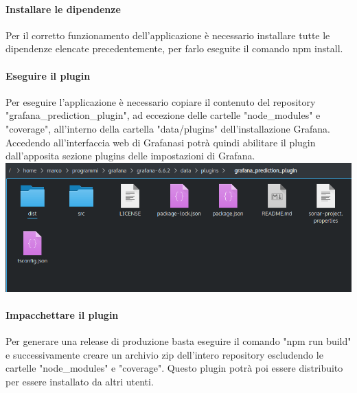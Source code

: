 \paragraph{Installare le dipendenze}
Per il corretto funzionamento dell'applicazione è necessario installare tutte le dipendenze elencate precedentemente, per farlo eseguite il comando npm install.

\paragraph{Eseguire il plugin}
Per eseguire l'applicazione è necessario copiare il contenuto del repository "grafana\_prediction\_plugin", ad eccezione delle cartelle "node\_modules" e "coverage", all'interno della cartella "data/plugins" dell'installazione Grafana\glo. Accedendo all'interfaccia web di Grafana\glosp si potrà quindi abilitare il plugin dall'apposita sezione plugins delle impostazioni di Grafana\glo.
\\
\includegraphics[width=\textwidth,height=\textheight,keepaspectratio]{img/plugin-directory.png}

\paragraph{Impacchettare il plugin}
Per generare una release di produzione basta eseguire il comando "npm run build" e successivamente creare un archivio zip dell'intero repository escludendo le cartelle "node\_modules" e "coverage". Questo plugin potrà poi essere distribuito per essere installato da altri utenti. 
